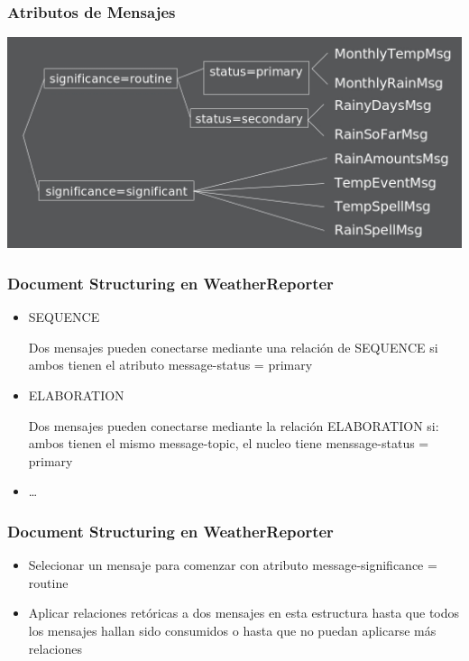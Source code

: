 \documentclass[compress,color=usenames]{beamer}
\begin{document}
\begin{frame}
\frametitle{Atributos de Mensajes}

\begin{center}
\includegraphics[scale=.4]{pics/pic9.jpg}
\end{center}

\end{frame}

\begin{frame}
\frametitle{Document Structuring en WeatherReporter}

\begin{itemize}
\item SEQUENCE

Dos mensajes pueden conectarse mediante una relaci\'on de SEQUENCE si ambos 
tienen el atributo message-status = primary

\item ELABORATION

Dos mensajes pueden conectarse mediante la relaci\'on ELABORATION si: 
ambos tienen el mismo message-topic, el nucleo tiene menssage-status = primary

\item \ldots
\end{itemize}
\end{frame}

\begin{frame}
\frametitle{Document Structuring en WeatherReporter}

\begin{itemize}

\item Selecionar un mensaje para comenzar con atributo message-significance = routine
\item Aplicar relaciones ret\'oricas a dos mensajes en esta estructura hasta que todos los mensajes hallan sido consumidos o hasta que no puedan aplicarse m\'as relaciones 

\end{itemize}
\end{frame}
\end{document}
